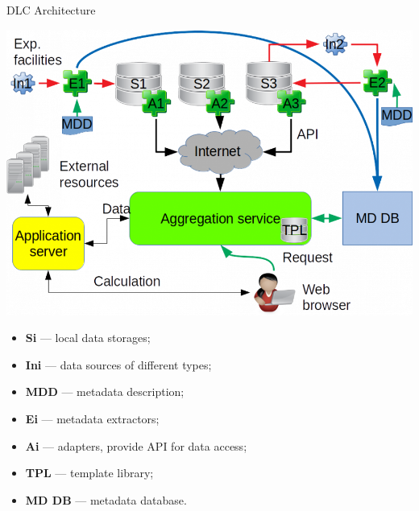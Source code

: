 \begin{frame}{DLC Architecture}
\begin{minipage}[c]{0.63\textwidth}
  \includegraphics[width=1\textwidth]{pics/arch_appds.png}
\end{minipage}
\hfill
\begin{minipage}[c]{0.36\textwidth}
  \small
  \begin{itemize}
    \setlength{\itemsep}{0pt}
    \item\textbf{Si} — local data storages;
    \item\textbf{Ini} — data sources of different types;
    \item\textbf{MDD} — metadata description;
    \item\textbf{Ei} — metadata extractors;
    \item\textbf{Ai} — adapters, provide API for data access;
    \item\textbf{TPL} — template library;
    \item\textbf{MD DB} — metadata database.
  \end{itemize}
\end{minipage}
\end{frame}

